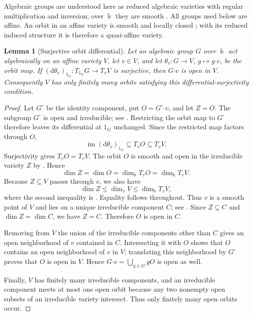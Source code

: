 \documentclass[11pt]{amsart}
\newtheorem{lemma}[theorem]{Lemma}
\theoremstyle{definition}
\theoremstyle{remark}
\newcommand{\kk}{\Bbbk}
\begin{document}
Algebraic groups are understood here as reduced algebraic varieties with
regular multiplication and inversion; over $\kk$ they are smooth
\cite[Proposition~1.2]{Borel}.  All groups used below are affine.
An orbit in an affine variety is smooth and locally closed
\cite[Proposition~1.8]{Borel}; with its reduced induced structure it is
therefore a quasi-affine variety.

\begin{lemma}[Surjective orbit differential]\label{lem:open-orbit}
Let an algebraic group $G$ over $\kk$ act algebraically on an affine variety
$V$, let $v\in V$, and let
$\theta_v:G\to V$, $g\mapsto g\boldsymbol\cdot v$, be the orbit map.  If
$(\mathrm d\theta_v)_{1_G}:T_{1_G}G\to T_vV$ is surjective, then
$G\boldsymbol\cdot v$ is open in $V$.  Consequently $V$ has only finitely
many orbits satisfying this differential-surjectivity condition.
\end{lemma}

\begin{proof}
Let $G^\circ$ be the identity component, put
$O=G^\circ\boldsymbol\cdot v$, and let $Z=\overline O$.
The subgroup $G^\circ$ is open and irreducible; see
\cite[Proposition~1.2, pp.~46--47]{Borel}.
Restricting the orbit map to $G^\circ$ therefore leaves its differential
at $1_G$ unchanged.  Since the restricted map factors through $O$,
\[
 \operatorname{im}(\mathrm d\theta_v)_{1_G}
 \subseteq T_vO\subseteq T_vV.
\]
Surjectivity gives $T_vO=T_vV$.  The orbit $O$ is smooth and open in the
irreducible variety $Z$ by \cite[Proposition~1.8, p.~53]{Borel}.  Hence
\[
 \dim Z=\dim O=\dim_{\kk}T_vO=\dim_{\kk}T_vV.
\]
Because $Z\subseteq V$ passes through $v$, we also have
\[
 \dim Z\leq\dim_vV\leq\dim_{\kk}T_vV,
\]
where the second inequality is
\cite[AG, \S{}3.9 and Theorem~17.1]{Borel}.
Equality follows throughout.  Thus $v$ is a smooth point of $V$ and lies
on a unique irreducible component $C$; see
\cite[AG, Theorem~17.1, p.~40]{Borel}.
Since $Z\subseteq C$ and $\dim Z=\dim C$, we have $Z=C$.
Therefore $O$ is open in $C$.

Removing from $V$ the union of the irreducible components other than $C$
gives an open neighborhood of $v$ contained in $C$.  Intersecting it with
$O$ shows that $O$ contains an open neighborhood of $v$ in $V$; translating
this neighborhood by $G^\circ$ proves that $O$ is open in $V$.  Hence
$G\boldsymbol\cdot v=\bigcup_{g\in G}gO$ is open as well.

Finally, $V$ has finitely many irreducible components, and an irreducible
component meets at most one open orbit because any two nonempty open
subsets of an irreducible variety intersect.  Thus only finitely many
open orbits occur.
\end{proof}
\end{document}
